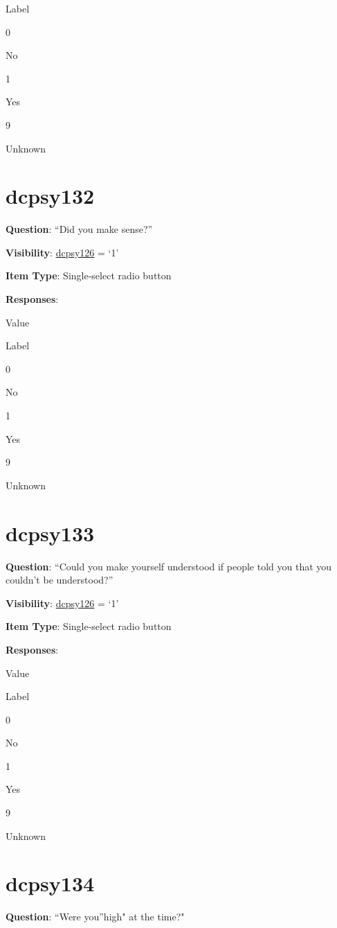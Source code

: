 \documentclass[]{book}
\begin{document}
Label

0

No

1

Yes

9

Unknown

\hypertarget{dcpsy132}{%
\section{dcpsy132}\label{dcpsy132}}

\textbf{Question}: ``Did you make sense?''

\textbf{Visibility}: \protect\hyperlink{dcpsy126}{dcpsy126} = `1'

\textbf{Item Type}: Single-select radio button

\textbf{Responses}:

Value

Label

0

No

1

Yes

9

Unknown

\hypertarget{dcpsy133}{%
\section{dcpsy133}\label{dcpsy133}}

\textbf{Question}: ``Could you make yourself understood if people told you that you couldn't be understood?''

\textbf{Visibility}: \protect\hyperlink{dcpsy126}{dcpsy126} = `1'

\textbf{Item Type}: Single-select radio button

\textbf{Responses}:

Value

Label

0

No

1

Yes

9

Unknown

\hypertarget{dcpsy134}{%
\section{dcpsy134}\label{dcpsy134}}

\textbf{Question}: ``Were you''high" at the time?"
\end{document}
